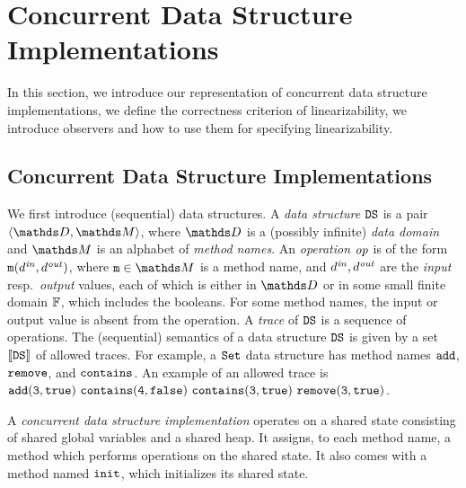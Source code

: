 \section{Concurrent Data Structure Implementations}
\label{programs:section}
In this section, we introduce our representation of
concurrent data structure implementations, we define the correctness criterion of
linearizability, we introduce observers and how to use them for specifying
linearizability.

\subsection{Concurrent Data Structure Implementations}

We first introduce (sequential) data structures.
A {\it data structure} ${\tt DS}$ is a pair
$\tuple{\ddomain,\malphabet}$,
where $\ddomain$ is a (possibly infinite) {\it data domain} and 
$\malphabet$ is an alphabet of {\em method names}.
%
%
An {\it operation} 
${\it op}$ is of the form
${\tt m}(d^{\it in},d^{\it out})$, where 
$\mname\in\malphabet$ is a method name, and 
$d^{\it in},d^{\it out}$ are the {\it input} resp.\ {\it output} values, each of which
is either in $\ddomain$ or in some small finite domain $\mathbb{F}$, which
includes the booleans.
%
For some method names, the input or output value is absent from the operation.
A {\it trace} of ${\tt DS}$ is a sequence of operations.
The (sequential) semantics of a data structure ${\tt DS}$ is given by
a set $\left\llbracket{{\tt DS}}\right\rrbracket$ of allowed traces.
For example, a $\tt Set$ data structure has method names
$\tt add$, $\tt remove$, and $\tt contains$. An example of an allowed trace
is ${\tt add(3,true)\ contains(4,false)\ contains(3,true) \ remove(3,true)}$.
%


A {\em concurrent data structure implementation} operates on a shared
state consisting of shared global variables and a shared heap.
It assigns, to each method name,  a method which performs operations
%
on the shared state. It
also comes with a method named $\tt init$, which initializes its shared state.

